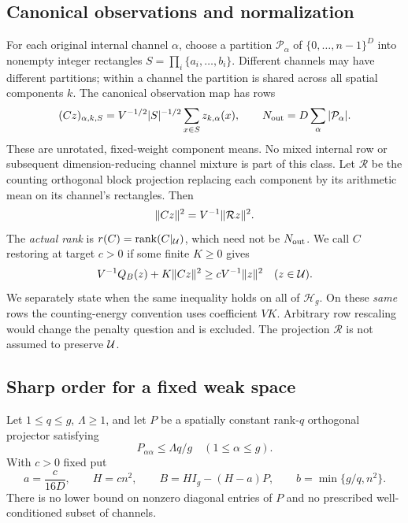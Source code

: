 \subsection{Canonical observations and normalization}
For each original internal channel $\alpha$, choose a partition
$\mathcal P_\alpha$ of $\{0,\ldots,n-1\}^D$ into nonempty integer rectangles
$S=\prod_i\{a_i,\ldots,b_i\}$. Different channels may have different partitions;
within a channel the partition is shared across all spatial components $k$.
The canonical observation map has rows
\begin{equation}\label{eq:canonical}
 (Cz)_{\alpha,k,S}=V^{-1/2}|S|^{-1/2}
             \sum_{x\in S}z_{k,\alpha}(x),\qquad
 N_{\rm out}=D\sum_\alpha|\mathcal P_\alpha|.
\end{equation}
These are unrotated, fixed-weight component means. No mixed internal row or
subsequent dimension-reducing channel mixture is part of this class.
Let $\mathcal R$ be the counting orthogonal block projection replacing each
component by its arithmetic mean on its channel's rectangles. Then
\begin{equation}\label{eq:RC}
 \lVert Cz\rVert^2=V^{-1}\lVert \mathcal Rz\rVert^2.
\end{equation}
The \emph{actual rank} is $r(C)=\operatorname{rank}(C|_\mathcal U)$, which need not be $N_{\rm out}$.
We call $C$ restoring at target $c>0$ if some finite $K\geq0$ gives
\begin{equation}\label{eq:restoring}
 V^{-1}Q_B(z)+K\lVert Cz\rVert^2\geq cV^{-1}\lVert z\rVert^2
 \quad(z\in\mathcal U).
\end{equation}
We separately state when the same inequality holds on all of $\mathcal H_g$.
On these \emph{same} rows the counting-energy convention uses coefficient $VK$.
Arbitrary row rescaling would change the penalty question and is excluded.
The projection $\mathcal R$ is not assumed to preserve $\mathcal U$.

\subsection{Sharp order for a fixed weak space}
Let $1\leq q\leq g$, $\Lambda\geq1$, and let $P$ be a spatially constant
rank-$q$ orthogonal projector satisfying
\begin{equation}\label{eq:coherence}
 P_{\alpha\alpha}\leq\Lambda q/g\quad(1\leq\alpha\leq g).
\end{equation}
With $c>0$ fixed put
\begin{equation}\label{eq:profile}
 a=\frac{c}{16D},\qquad H=cn^2,\qquad
 B=HI_g-(H-a)P,\qquad b=\min\{g/q,n^2\}.
\end{equation}
There is no lower bound on nonzero diagonal entries of $P$ and no prescribed
well-conditioned subset of channels.

